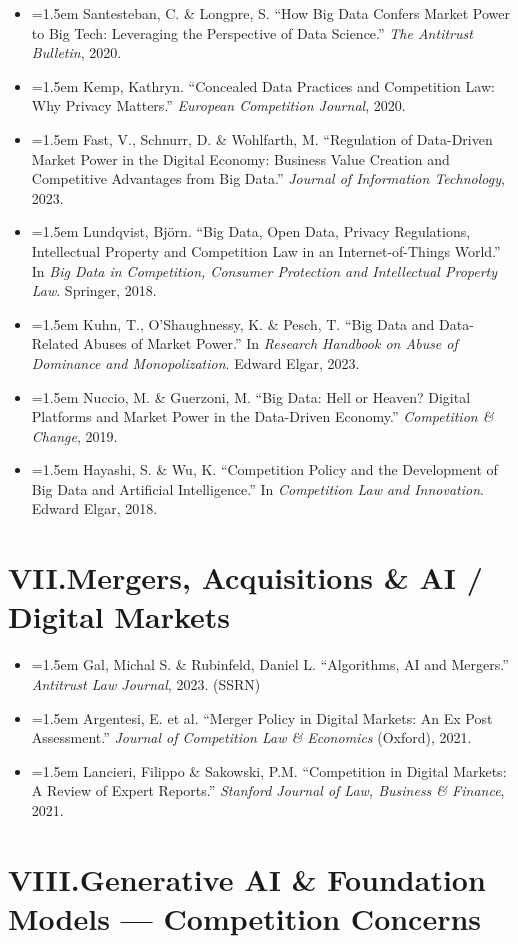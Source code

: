 \documentclass[12pt, letterpaper]{article}
\newcommand{\entry}[1]{%
  \item \hangindent=1.5em \hangafter=1 #1%
}
\begin{document}
\begin{itemize}
\entry{Santesteban, C. \& Longpre, S. ``How Big Data Confers Market Power to Big Tech: Leveraging the Perspective of Data Science.'' \textit{The Antitrust Bulletin}, 2020.}
\entry{Kemp, Kathryn. ``Concealed Data Practices and Competition Law: Why Privacy Matters.'' \textit{European Competition Journal}, 2020.}
\entry{Fast, V., Schnurr, D. \& Wohlfarth, M. ``Regulation of Data-Driven Market Power in the Digital Economy: Business Value Creation and Competitive Advantages from Big Data.'' \textit{Journal of Information Technology}, 2023.}
\entry{Lundqvist, Björn. ``Big Data, Open Data, Privacy Regulations, Intellectual Property and Competition Law in an Internet-of-Things World.'' In \textit{Big Data in Competition, Consumer Protection and Intellectual Property Law}. Springer, 2018.}
\entry{Kuhn, T., O'Shaughnessy, K. \& Pesch, T. ``Big Data and Data-Related Abuses of Market Power.'' In \textit{Research Handbook on Abuse of Dominance and Monopolization}. Edward Elgar, 2023.}
\entry{Nuccio, M. \& Guerzoni, M. ``Big Data: Hell or Heaven? Digital Platforms and Market Power in the Data-Driven Economy.'' \textit{Competition \& Change}, 2019.}
\entry{Hayashi, S. \& Wu, K. ``Competition Policy and the Development of Big Data and Artificial Intelligence.'' In \textit{Competition Law and Innovation}. Edward Elgar, 2018.}
\end{itemize}

\section{VII.\quad Mergers, Acquisitions \& AI / Digital Markets}

\begin{itemize}
\entry{Gal, Michal S. \& Rubinfeld, Daniel L. ``Algorithms, AI and Mergers.'' \textit{Antitrust Law Journal}, 2023. (SSRN)}
\entry{Argentesi, E. et al. ``Merger Policy in Digital Markets: An Ex Post Assessment.'' \textit{Journal of Competition Law \& Economics} (Oxford), 2021.}
\entry{Lancieri, Filippo \& Sakowski, P.M. ``Competition in Digital Markets: A Review of Expert Reports.'' \textit{Stanford Journal of Law, Business \& Finance}, 2021.}
\end{itemize}

\section{VIII.\quad Generative AI \& Foundation Models --- Competition Concerns}
\end{document}
